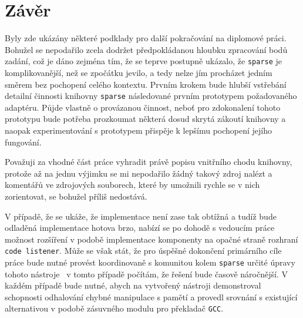 \chapter{Závěr}
\label{chap:zaver}

Byly zde ukázány některé podklady pro další pokračování na diplomové práci.
Bohužel se nepodařilo zcela dodržet předpokládanou hloubku zpracování
bodů zadání, což je dáno zejména tím, že se teprve postupně ukázalo, že
\texttt{sparse} je komplikovanější, než se zpočátku jevilo, a tedy
nelze jím procházet jedním směrem bez pochopení celého kontextu.
Prvním krokem bude hlubší vstřebání detailní činnosti knihovny \texttt{sparse}
následované prvním prototypem požadovaného adaptéru. Půjde vlastně o provázanou
činnost, neboť pro zdokonalení tohoto prototypu bude potřeba prozkoumat některá
dosud skrytá zákoutí knihovny a naopak experimentování s prototypem přispěje
k lepšímu pochopení jejího fungování.

Považuji za vhodné část práce vyhradit právě popisu vnitřního chodu knihovny,
protože až na jednu výjimku se mi nepodařilo žádný takový zdroj nalézt
a komentářů ve zdrojových souborech, které by umožnili rychle se v nich
zorientovat, se bohužel příliš nedostává.

V případě, že se ukáže, že implementace není zase tak obtížná a tudíž
bude odladěná implementace hotova brzo, nabízí se po dohodě s vedoucím
práce možnost rozšíření v podobě implementace komponenty na opačné straně
rozhraní \texttt{code listener}. Může se však stát, že pro úspěšné dokončení
primárního cíle práce bude nutné provést koordinovaně s komunitou kolem
\texttt{sparse} určité úpravy tohoto nástroje \ndash\ v tomto případě
počítám, že řešení bude časově náročnější. V každém případě bude nutné,
abych na vytvořený nástroji demonstroval schopnosti odhalování chybné
manipulace s pamětí a provedl srovnání s existující alternativou
v podobě zásuvného modulu pro překladač \texttt{GCC}.
